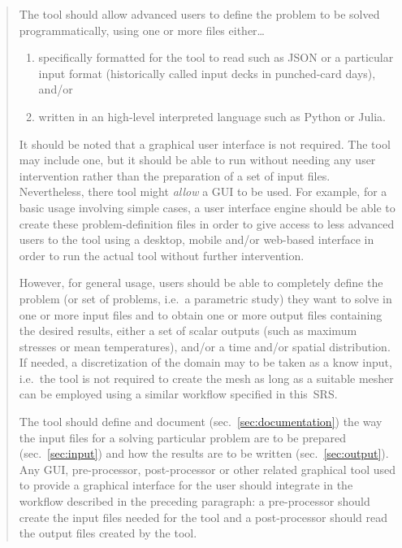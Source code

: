 \documentclass[
  american,
]{article}
\providecommand{\tightlist}{%
  \setlength{\itemsep}{0pt}\setlength{\parskip}{0pt}}
\begin{document}
\begin{quote}
The tool should allow advanced users to define the problem to be solved
programmatically, using one or more files either\ldots{}

\begin{enumerate}
\def\labelenumi{\alph{enumi}.}
\tightlist
\item
  specifically formatted for the tool to read such as JSON or a
  particular input format (historically called input decks in
  punched-card days), and/or
\item
  written in an high-level interpreted language such as Python or Julia.
\end{enumerate}

It should be noted that a graphical user interface is not required. The
tool may include one, but it should be able to run without needing any
user intervention rather than the preparation of a set of input files.
Nevertheless, there tool might \emph{allow} a GUI to be used. For
example, for a basic usage involving simple cases, a user interface
engine should be able to create these problem-definition files in order
to give access to less advanced users to the tool using a desktop,
mobile and/or web-based interface in order to run the actual tool
without further intervention.

However, for general usage, users should be able to completely define
the problem (or set of problems, i.e.~a parametric study) they want to
solve in one or more input files and to obtain one or more output files
containing the desired results, either a set of scalar outputs (such as
maximum stresses or mean temperatures), and/or a time and/or spatial
distribution. If needed, a discretization of the domain may to be taken
as a know input, i.e.~the tool is not required to create the mesh as
long as a suitable mesher can be employed using a similar workflow
specified in this~SRS.

The tool should define and document (sec.~\ref{sec:documentation}) the
way the input files for a solving particular problem are to be prepared
(sec.~\ref{sec:input}) and how the results are to be written
(sec.~\ref{sec:output}). Any GUI, pre-processor, post-processor or other
related graphical tool used to provide a graphical interface for the
user should integrate in the workflow described in the preceding
paragraph: a pre-processor should create the input files needed for the
tool and a post-processor should read the output files created by the
tool.
\end{quote}
\end{document}
